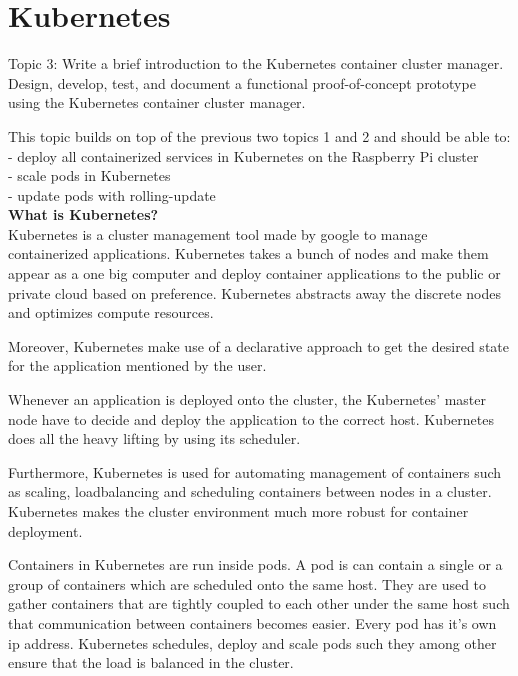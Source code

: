 \chapter{Kubernetes}\label{ch:kubernetes}
Topic 3: Write a brief introduction to the Kubernetes container cluster manager. 
Design, develop, test, and document a functional proof-of-concept prototype using the Kubernetes container cluster manager. 

This topic builds on top of the previous two topics 1 and 2 and should be able to:\\
- deploy all containerized services in Kubernetes on the Raspberry Pi cluster \\
- scale pods in Kubernetes \\
- update pods with rolling-update \\

\textbf{What is Kubernetes?}\\
Kubernetes is a cluster management tool made by google to manage containerized applications. Kubernetes takes a bunch of nodes and make them appear as a one big computer and deploy container applications to the public or private cloud based on preference. Kubernetes abstracts away the discrete nodes and optimizes compute resources.  

Moreover, Kubernetes make use of a declarative approach to get the desired state for the application mentioned by the user. 

Whenever an application is deployed onto the cluster, the Kubernetes' master node have to decide and deploy the application to the correct host. Kubernetes does all the heavy lifting by using its scheduler. 

Furthermore, Kubernetes is used for automating management of containers such as scaling, loadbalancing and scheduling containers between nodes in a cluster. Kubernetes makes the cluster environment much more robust for container deployment.

Containers in Kubernetes are run inside pods. A pod is can contain a single or a group of containers which are scheduled onto the same host. They are used to gather containers that are tightly coupled to each other under the same host such that communication between containers becomes easier. Every pod has it's own ip address. Kubernetes schedules, deploy and scale pods such they among other ensure that the load is balanced in the cluster. 

